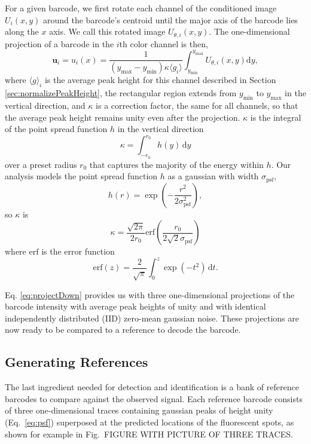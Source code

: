   For a given barcode, we first rotate each channel of the  conditioned image $U_i(x,y)$ around the barcode's centroid until the major axis of the barcode lies along the $x$ axis. We call this rotated image  $U_{\theta,i}(x,y)$. The one-dimensional projection of a barcode in the $i$th color channel is then, 
\begin{equation}\label{eq:projectDown}
	   \mathbf{u}_i=u_i(x)=\frac{1}{(y_{\text{max}}-y_{\text{min}})\kappa\langle g_i \rangle}  \int_{y_{\text{min}}}^{y_{\text{max}}} { {U_{\theta,i}(x,y) \mathrm{d}y} },
\end{equation}
where $\langle g \rangle_i$ is the average peak height for this channel described in Section \ref{sec:normalizePeakHeight}, the rectangular region extends from $y_{\text{min}}$ to $y_{\text{max}}$ in the vertical direction, and $\kappa$ is a correction factor, the same for all channels, so that the average peak height remains unity even after the projection. $\kappa$ is the integral of the point spread function $h$ in the vertical direction
\begin{equation}
	\kappa=\int_{-r_0}^{r_0} h(y) \, \mathrm{d}y
\end{equation}
over a preset radius $r_0$ that captures the majority of the energy within $h$. Our analysis models the point spread function $h$ as a gaussian with width $\sigma_{\text{psf}}$,
\begin{equation}\label{eq:psf}
h(r)=\exp \left(  -\frac{r^2}{2\sigma_{\text{psf}}^2} \right),
\end{equation}
so $\kappa$ is
\begin{equation}
\kappa = \frac{\sqrt{2\pi}} {2r_0} \text{erf} \left(\frac{r_0}{2\sqrt{2}\sigma_{\text{psf}}} \right)
\end{equation}
where $\text{erf}$ is the error function \citep{reif_fundamentals_1965}
\begin{equation}
\text{erf}(z) = \frac{2}{\sqrt{\pi}} \int_0^z \exp (-t^2) \, \mathrm{d}t.
\end{equation}

Eq. \ref{eq:projectDown} provides us with three one-dimensional projections of the barcode intensity with average peak heights of unity and with identical independently distributed (IID) zero-mean gaussian noise. These projections are now ready to be compared to a reference to decode the barcode.

\subsection{Generating References}\label{sec:generateReferences}
The last ingredient needed for detection and identification is a bank of reference barcodes to compare against the observed signal. Each reference barcode consists of three one-dimensional traces containing  gaussian peaks of height unity (Eq.~\ref{eq:psf}) superposed at the predicted locations of the fluorescent spots, as shown for example in Fig.~FIGURE WITH PICTURE OF THREE TRACES. 


